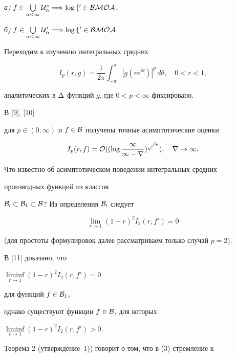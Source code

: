 \begin{thm}


{\em а)} $f\in\bigcup\limits_{\al<\infty}\Ua^\ast\Longrightarrow


\log f'\in BMOA$,





{\em б)} $f\in\bigcup\limits_{\al<\infty}\Ua'\Longrightarrow


\log f'\in BMOA$.


\end{thm}





Переходим к изучению интегральных средних


$$


I_p(r,g)=\frac{1}{2\pi}\int_{-\pi}^{\pi}|g(re^{i\theta})|^p\, d\theta,


\quad 0<r<1,


$$


аналитических в $\Delta$ функций $g$, где $0<p<\infty$ фиксировано.


В [9], [10]


для $p\in(0,\infty)$ и $f\in{\cal B}$ получены точные асимптотические оценки


$$


I_p(r,f)=\cal O((\log\frac1{1-r})^{p/2}),\quad r\to 1.


$$


Что известно об асимптотическом поведении интегральных средних


производных функций из классов


${\cal B_0}\subset{\cal B}_1\subset{\cal B}$? Из определения ${\cal B_0}$ следует


\begin{equation}


\lim_{r\to 1}(1-r)^2I_2(r,f')=0


\end{equation}


(для простоты формулировок далее рассматриваем только случай $p=2$).


В [11] доказано, что


$\liminf\limits_{r\to 1}(1-r)^2I_2(r,f')=0$


для функций $f\in{\cal B}_1$,


однако существуют функции $f\in{\cal B}$, для которых


$\liminf\limits_{r\to 1}(1-r)^2I_2(r,f')>0$.


Теорема 2 (утверждение~1)) говорит о том, что в (3) стремление к


